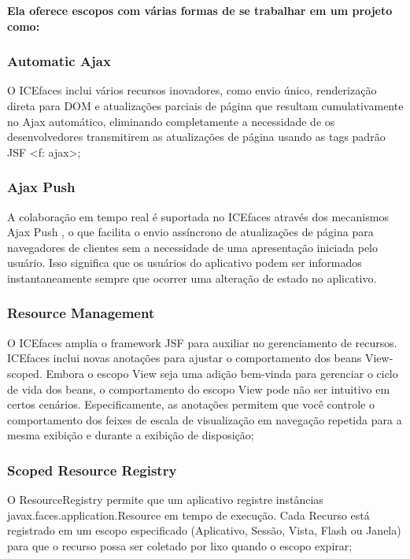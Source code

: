 \documentclass[12pt,a4paper]{article}
\begin{document}
\vspace{0.5cm}
\textbf{Ela oferece escopos com várias formas de se trabalhar em um projeto como:}

\subsubsection{Automatic Ajax}
O ICEfaces inclui vários recursos inovadores, como envio único, renderização direta para DOM e atualizações parciais de página que resultam cumulativamente no Ajax automático, eliminando completamente a necessidade de os desenvolvedores transmitirem as atualizações de página usando as tags padrão JSF <f: ajax>;

\subsubsection{Ajax Push}
A colaboração em tempo real é suportada no ICEfaces através dos mecanismos Ajax Push , o que facilita o envio assíncrono de atualizações de página para navegadores de clientes sem a necessidade de uma apresentação iniciada pelo usuário. Isso significa que os usuários do aplicativo podem ser informados instantaneamente sempre que ocorrer uma alteração de estado no aplicativo.

\subsubsection{Resource Management}
O ICEfaces amplia o framework JSF para auxiliar no gerenciamento de recursos. ICEfaces inclui novas anotações para ajustar o comportamento dos beans View-scoped. Embora o escopo View seja uma adição bem-vinda para gerenciar o ciclo de vida dos beans, o comportamento do escopo View pode não ser intuitivo em certos cenários. Especificamente, as anotações permitem que você controle o comportamento dos feixes de escala de visualização em navegação repetida para a mesma exibição e durante a exibição de disposição;

\subsubsection{Scoped Resource Registry}
O ResourceRegistry permite que um aplicativo registre instâncias javax.faces.application.Resource em tempo de execução. Cada Recurso está registrado em um escopo especificado (Aplicativo, Sessão, Vista, Flash ou Janela) para que o recurso possa ser coletado por lixo quando o escopo expirar;
\end{document}
